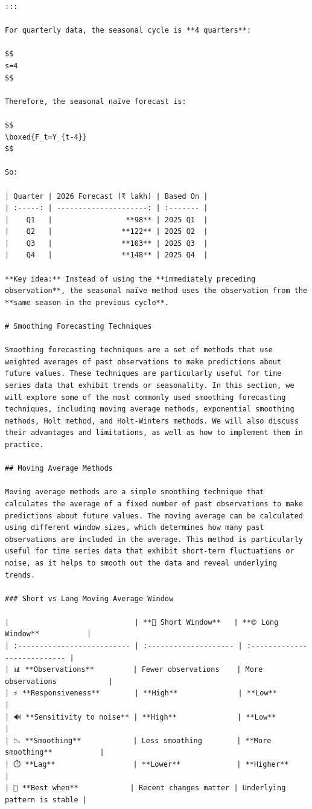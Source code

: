 \documentclass[
  a4paper,
]{article}
\begin{document}
\begin{verbatim}
::: 
      
For quarterly data, the seasonal cycle is **4 quarters**:
  
$$
s=4
$$
  
Therefore, the seasonal naïve forecast is:
  
$$
\boxed{F_t=Y_{t-4}}
$$
   
So:
  
| Quarter | 2026 Forecast (₹ lakh) | Based On |
| :-----: | ---------------------: | :------- |
|    Q1   |                 **98** | 2025 Q1  |
|    Q2   |                **122** | 2025 Q2  |
|    Q3   |                **103** | 2025 Q3  |
|    Q4   |                **148** | 2025 Q4  |
  
**Key idea:** Instead of using the **immediately preceding observation**, the seasonal naïve method uses the observation from the **same season in the previous cycle**.
  
# Smoothing Forecasting Techniques  
  
Smoothing forecasting techniques are a set of methods that use weighted averages of past observations to make predictions about future values. These techniques are particularly useful for time series data that exhibit trends or seasonality. In this section, we will explore some of the most commonly used smoothing forecasting techniques, including moving average methods, exponential smoothing methods, Holt method, and Holt-Winters methods. We will also discuss their advantages and limitations, as well as how to implement them in practice.

## Moving Average Methods
  
Moving average methods are a simple smoothing technique that calculates the average of a fixed number of past observations to make predictions about future values. The moving average can be calculated using different window sizes, which determines how many past observations are included in the average. This method is particularly useful for time series data that exhibit short-term fluctuations or noise, as it helps to smooth out the data and reveal underlying trends.
  
### Short vs Long Moving Average Window
  
|                             | **🔎 Short Window**   | **🌐 Long Window**           |
| :-------------------------- | :-------------------- | :--------------------------- |
| 📊 **Observations**         | Fewer observations    | More observations            |
| ⚡ **Responsiveness**        | **High**              | **Low**                      |
| 🔊 **Sensitivity to noise** | **High**              | **Low**                      |
| 📉 **Smoothing**            | Less smoothing        | **More smoothing**           |
| ⏱️ **Lag**                  | **Lower**             | **Higher**                   |
| 🎯 **Best when**            | Recent changes matter | Underlying pattern is stable |
  

\end{verbatim}
\end{document}
